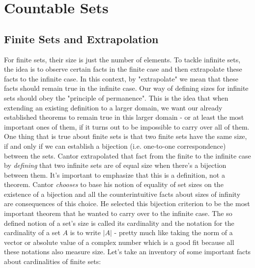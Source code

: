 \documentclass[12pt]{article}
\begin{document}


\section{Countable Sets}

\subsection{Finite Sets and Extrapolation}
For finite sets, their size is just the number of elements. To tackle infinite sets, the idea is to observe certain facts in the finite case and then extrapolate these facts to the infinite case. In this context, by "extrapolate" we mean that these facts should remain true in the infinite case. Our way of defining sizes for infinite sets should obey the "principle of permanence". This is the idea that when extending an existing definition to a larger domain, we want our already established theorems to remain true in this larger domain - or at least the most important ones of them, if it turns out to be impossible to carry over all of them. One thing that is true about finite sets is that two finite sets have the same size, if and only if we can establish a bijection (i.e. one-to-one correspondence) between the sets. Cantor extrapolated that fact from the finite to the infinite case by \emph{defining} that two infinite sets are of equal size when there's a bijection between them. It's important to emphasize that this is a definition, not a theorem. Cantor \emph{chooses} to base his notion of equality of set sizes on the existence of a bijection and all the counterintuitive facts about sizes of infinity are consequences of this choice. He selected this bijection criterion to be the most important theorem that he wanted to carry over to the infinite case. The so defined notion of a set's size is called its cardinality and the notation for the cardinality of a set $A$ is to write $|A|$ - pretty much like taking the norm of a vector or absolute value of a complex number which is a good fit because all these notations also measure size. Let's take an inventory of some important facts about cardinalities of finite sets:
\end{document}
